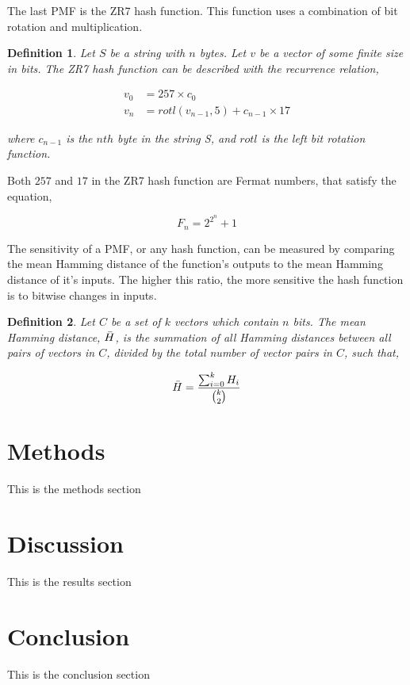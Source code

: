 \documentclass{article}
\newtheorem{definition}{Definition}[subsection]
\begin{document}
The last PMF is the ZR7 hash function. This function uses a combination of bit rotation and multiplication.

\begin{definition}
Let $S$ be a string with $n$ bytes. Let $v$ be a vector of some finite size in bits. The ZR7 hash function can be described with the recurrence relation,

\begin{align*}
    v_0 &= 257 \times c_0 \\
    v_n &= rotl(v_{n-1}, 5) + c_{n-1} \times 17
\end{align*}

where $c_{n-1}$ is the $nth$ byte in the string S, and $rotl$ is the left bit rotation function. 

\end{definition}

Both $257$ and $17$ in the ZR7 hash function are Fermat numbers\citep{robinson1954mersenne}, that satisfy the equation,

$$
    F_n = 2^{2^n} + 1
$$

The sensitivity of a PMF, or any hash function, can be measured by comparing the mean Hamming distance of the function's outputs to the mean Hamming distance of it's inputs. The higher this ratio, the more sensitive the hash function is to bitwise changes in inputs. 

\begin{definition}
Let $C$ be a set of $k$ vectors which contain $n$ bits. The mean Hamming distance, $\Bar{H}$, is the summation of all Hamming distances between all pairs of vectors in $C$, divided by the total number of vector pairs in $C$, such that,

$$
   \Bar{H} = \frac{\sum^{k}_{i=0} H_i }{\binom{k}{2}}
$$
\end{definition}

\section{Methods}

This is the methods section

\section{Discussion}

This is the results section



\section{Conclusion}
This is the conclusion section



\end{document}

